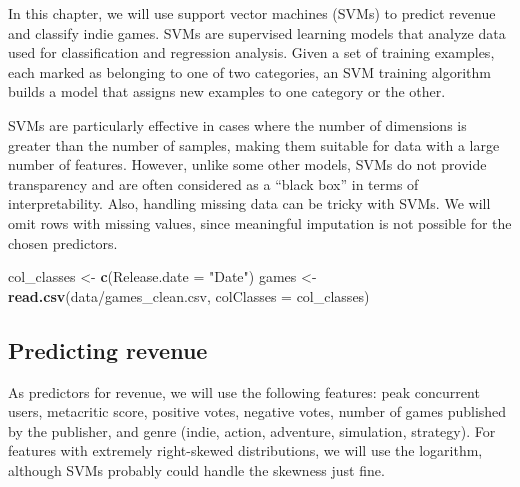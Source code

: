 \documentclass[
]{article}
\newenvironment{Shaded}{\begin{snugshade}}{\end{snugshade}}
\newcommand{\AttributeTok}[1]{\textcolor[rgb]{0.13,0.29,0.53}{#1}}
\newcommand{\FunctionTok}[1]{\textcolor[rgb]{0.13,0.29,0.53}{\textbf{#1}}}
\newcommand{\NormalTok}[1]{#1}
\newcommand{\OtherTok}[1]{\textcolor[rgb]{0.56,0.35,0.01}{#1}}
\newcommand{\StringTok}[1]{\textcolor[rgb]{0.31,0.60,0.02}{#1}}
\begin{document}
In this chapter, we will use support vector machines (SVMs) to predict
revenue and classify indie games. SVMs are supervised learning models
that analyze data used for classification and regression analysis. Given
a set of training examples, each marked as belonging to one of two
categories, an SVM training algorithm builds a model that assigns new
examples to one category or the other.

SVMs are particularly effective in cases where the number of dimensions
is greater than the number of samples, making them suitable for data
with a large number of features. However, unlike some other models, SVMs
do not provide transparency and are often considered as a ``black box''
in terms of interpretability. Also, handling missing data can be tricky
with SVMs. We will omit rows with missing values, since meaningful
imputation is not possible for the chosen predictors.

\begin{Shaded}
\begin{Highlighting}[]
\NormalTok{col\_classes }\OtherTok{\textless{}{-}} \FunctionTok{c}\NormalTok{(}\AttributeTok{Release.date =} \StringTok{"Date"}\NormalTok{)}
\NormalTok{games }\OtherTok{\textless{}{-}} \FunctionTok{read.csv}\NormalTok{(}\StringTok{\textquotesingle{}data/games\_clean.csv\textquotesingle{}}\NormalTok{, }\AttributeTok{colClasses =}\NormalTok{ col\_classes)}
\end{Highlighting}
\end{Shaded}

\hypertarget{predicting-revenue}{%
\subsection{Predicting revenue}\label{predicting-revenue}}

As predictors for revenue, we will use the following features: peak
concurrent users, metacritic score, positive votes, negative votes,
number of games published by the publisher, and genre (indie, action,
adventure, simulation, strategy). For features with extremely
right-skewed distributions, we will use the logarithm, although SVMs
probably could handle the skewness just fine.
\end{document}
